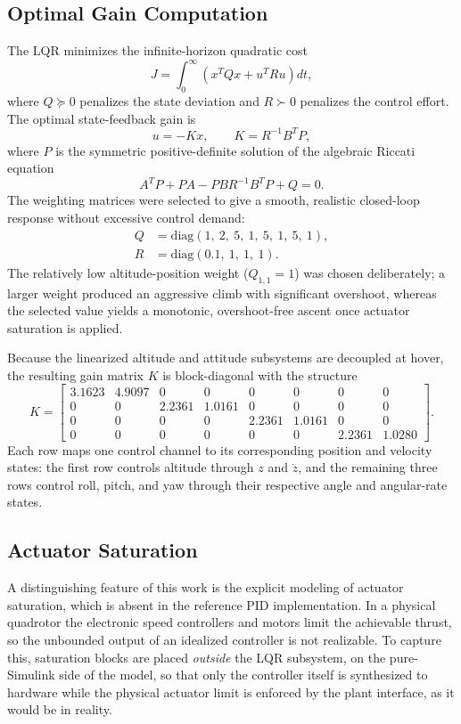\documentclass[conference]{IEEEtran}
\begin{document}
\subsection{Optimal Gain Computation}
The LQR minimizes the infinite-horizon quadratic cost
\begin{equation}
J = \int_0^{\infty} \left( x^{T} Q x + u^{T} R u \right) dt,
\end{equation}
where $Q \succeq 0$ penalizes the state deviation and $R \succ 0$ penalizes the control effort. The optimal state-feedback gain is
\begin{equation}
u = -Kx, \qquad K = R^{-1} B^{T} P,
\end{equation}
where $P$ is the symmetric positive-definite solution of the algebraic Riccati equation
\begin{equation}
A^{T} P + P A - P B R^{-1} B^{T} P + Q = 0.
\end{equation}
The weighting matrices were selected to give a smooth, realistic closed-loop response without excessive control demand:
\begin{align}
Q &= \text{diag}(1,\ 2,\ 5,\ 1,\ 5,\ 1,\ 5,\ 1),\\
R &= \text{diag}(0.1,\ 1,\ 1,\ 1).
\end{align}
The relatively low altitude-position weight ($Q_{1,1}=1$) was chosen deliberately; a larger weight produced an aggressive climb with significant overshoot, whereas the selected value yields a monotonic, overshoot-free ascent once actuator saturation is applied.

Because the linearized altitude and attitude subsystems are decoupled at hover, the resulting gain matrix $K$ is block-diagonal with the structure
\begin{equation}
K = \begin{bmatrix}
3.1623 & 4.9097 & 0 & 0 & 0 & 0 & 0 & 0 \\
0 & 0 & 2.2361 & 1.0161 & 0 & 0 & 0 & 0 \\
0 & 0 & 0 & 0 & 2.2361 & 1.0161 & 0 & 0 \\
0 & 0 & 0 & 0 & 0 & 0 & 2.2361 & 1.0280
\end{bmatrix}.
\end{equation}
Each row maps one control channel to its corresponding position and velocity states: the first row controls altitude through $z$ and $\dot{z}$, and the remaining three rows control roll, pitch, and yaw through their respective angle and angular-rate states.

\subsection{Actuator Saturation}
A distinguishing feature of this work is the explicit modeling of actuator saturation, which is absent in the reference PID implementation. In a physical quadrotor the electronic speed controllers and motors limit the achievable thrust, so the unbounded output of an idealized controller is not realizable. To capture this, saturation blocks are placed \emph{outside} the LQR subsystem, on the pure-Simulink side of the model, so that only the controller itself is synthesized to hardware while the physical actuator limit is enforced by the plant interface, as it would be in reality.
\end{document}
